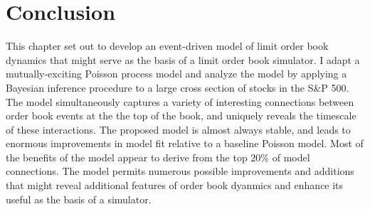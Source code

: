 \section{Conclusion}
	This chapter set out to develop an event-driven model of limit order book dynamics that might serve as the basis of a limit order book simulator. I adapt a mutually-exciting Poisson process model and analyze the model by applying a Bayesian inference procedure to a large cross section of stocks in the S\&P 500. The model simultaneously captures a variety of interesting connections between order book events at the the top of the book, and uniquely reveals the timescale of these interactions. The proposed model is almost always stable, and leads to enormous improvements in model fit relative to a baseline Poisson model. Most of the benefits of the model appear to derive from the top 20\% of model connections. The model permits numerous possible improvements and additions that might reveal additional features of order book dyanmics and enhance its useful as the basis of a simulator.
